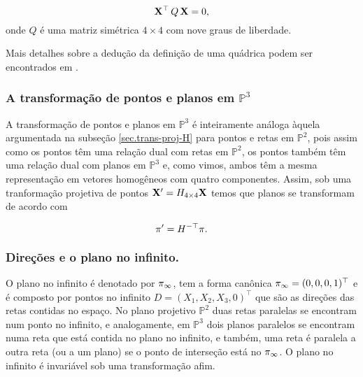 \begin{equation*}
\mathbf{X}^\top\,Q\,\mathbf{X} = 0,
\end{equation*}
onde $Q$ é uma matriz simétrica $4\times4$ com nove graus de liberdade.



Mais detalhes sobre a dedução da definição de uma quádrica podem ser encontrados em \cite{Hartley2004}.

\subsubsection{A transformação de pontos e planos em $\mathbb{P}^3$}\label{sec.trans-pontos-planos-P3}

A transformação de pontos e planos em $\mathbb{P}^3$ é inteiramente análoga àquela argumentada na subseção \ref{sec.trans-proj-H} para pontos e retas em $\mathbb{P}^2$, pois assim como os pontos têm uma relação dual com retas em $\mathbb{P}^2$, os pontos também têm uma relação dual com planos em $\mathbb{P}^3$ e, como vimos, ambos têm a mesma representação em vetores homogêneos com quatro componentes. Assim, sob uma tranformação projetiva de pontos $\mathbf{X}'=H_{4\times4}\mathbf{X}$ temos que planos se transformam de acordo com

\begin{equation*}
\pi'=H^{-\top}\pi.
\end{equation*}







\subsubsection{Direções e o plano no infinito.}\label{sec.direcoes-plano-infinito}

O plano no infinito é denotado por $\pi_\infty$, tem a forma canônica $\pi_\infty=(0,0,0,1)^\top$ e é composto por pontos no infinito $D=(X_1,X_2,X_3,0)^\top$ que são as direções das retas contidas no espaço. No plano projetivo $\mathbb{P}^2$ duas retas paralelas se encontram num ponto no infinito, e analogamente, em  $\mathbb{P}^3$ dois planos paralelos se encontram numa reta que está contida no plano no infinito, e também, uma reta é paralela a outra reta (ou a um plano) se o ponto de interseção está no $\pi_\infty$. O plano no infinito é invariável sob uma transformação afim.

